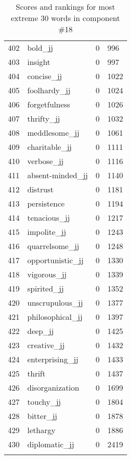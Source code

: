\begin{longtable}[!htbp]{| rlr@{.}l |}
    402 & bold\_jj & 0 & 996 \\
    403 & insight & 0 & 997 \\
    404 & concise\_jj & 0 & 1022 \\
    405 & foolhardy\_jj & 0 & 1024 \\
    406 & forgetfulness & 0 & 1026 \\
    407 & thrifty\_jj & 0 & 1032 \\
    408 & meddlesome\_jj & 0 & 1061 \\
    409 & charitable\_jj & 0 & 1111 \\
    410 & verbose\_jj & 0 & 1116 \\
    411 & absent-minded\_jj & 0 & 1140 \\
    412 & distrust & 0 & 1181 \\
    413 & persistence & 0 & 1194 \\
    414 & tenacious\_jj & 0 & 1217 \\
    415 & impolite\_jj & 0 & 1243 \\
    416 & quarrelsome\_jj & 0 & 1248 \\
    417 & opportunistic\_jj & 0 & 1330 \\
    418 & vigorous\_jj & 0 & 1339 \\
    419 & spirited\_jj & 0 & 1352 \\
    420 & unscrupulous\_jj & 0 & 1377 \\
    421 & philosophical\_jj & 0 & 1397 \\
    422 & deep\_jj & 0 & 1425 \\
    423 & creative\_jj & 0 & 1432 \\
    424 & enterprising\_jj & 0 & 1433 \\
    425 & thrift & 0 & 1437 \\
    426 & disorganization & 0 & 1699 \\
    427 & touchy\_jj & 0 & 1804 \\
    428 & bitter\_jj & 0 & 1878 \\
    429 & lethargy & 0 & 1886 \\
    430 & diplomatic\_jj & 0 & 2419 \\
    \hline
    \caption{Scores and rankings for most extreme 30 words in component \#18} \\
\end{longtable}
